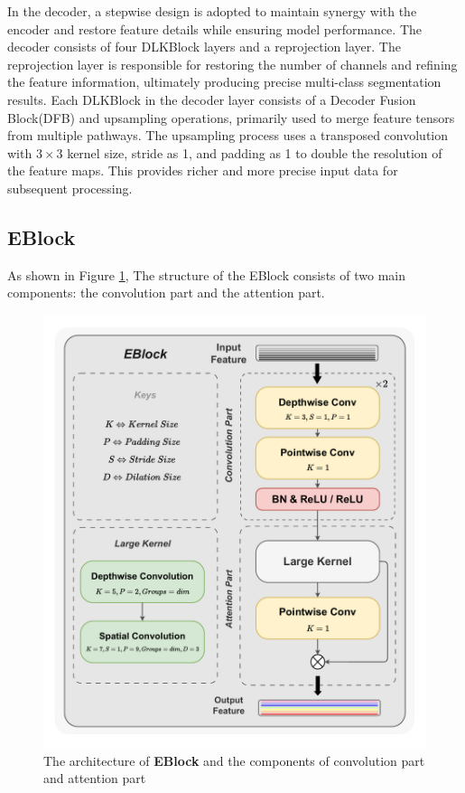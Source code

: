 \documentclass[sn-mathphys-num]{sn-jnl}
\theoremstyle{thmstyleone}%
\theoremstyle{thmstyletwo}%
\theoremstyle{thmstylethree}%
\begin{document}
In the decoder, a stepwise design is adopted to maintain synergy with the encoder and restore feature details while ensuring model performance.
The decoder consists of four DLKBlock layers and a reprojection layer.
The reprojection layer is responsible for restoring the number of channels and refining the feature information, ultimately producing precise multi-class segmentation results.
Each DLKBlock in the decoder layer consists of a Decoder Fusion Block(DFB) and upsampling operations, primarily used to merge feature tensors from multiple pathways.
The upsampling process uses a transposed convolution with \(3\times 3\) kernel size, stride as 1, and padding as 1 to double the resolution of the feature maps.
This provides richer and more precise input data for subsequent processing.

\subsection{EBlock}\label{subsec2}
As shown in Figure \ref{fig2}, The structure of the EBlock consists of two main components: the convolution part and the attention part. 

\begin{figure}[ht]
    \centering
    \includegraphics[height=0.6\textheight]{figure2.pdf}
    \caption{The architecture of \textbf{EBlock} and the components of convolution part and attention part}\label{fig2}
\end{figure}
\end{document}
